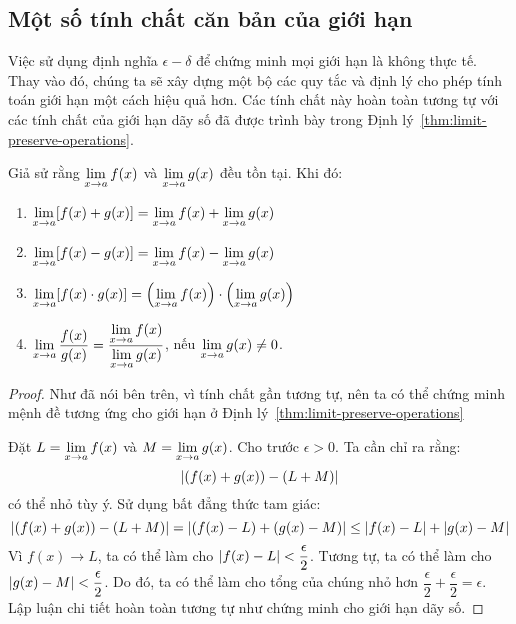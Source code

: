 
\subsection{Một số tính chất căn bản của giới hạn}
\label{subsec:tinh-chat-gioi-han}

Việc sử dụng định nghĩa $\epsilon-\delta$ để chứng minh mọi giới hạn là không thực tế. Thay vào đó, chúng ta sẽ xây dựng một bộ các quy tắc và định lý cho phép tính toán giới hạn một cách hiệu quả hơn. Các tính chất này hoàn toàn tương tự với các tính chất của giới hạn dãy số đã được trình bày trong Định lý~\ref{thm:limit-preserve-operations}.

\begin{theorem}
    \label{thm:limit-laws}
    Giả sử rằng $\lim\limits_{x \to a} f(x)$ và $\lim\limits_{x \to a} g(x)$ đều tồn tại. Khi đó:
    \begin{enumerate}[label=(\alph*)]
        \item $\lim\limits_{x \to a} [f(x) + g(x)] = \lim\limits_{x \to a} f(x) + \lim\limits_{x \to a} g(x)$
        \item $\lim\limits_{x \to a} [f(x) - g(x)] = \lim\limits_{x \to a} f(x) - \lim\limits_{x \to a} g(x)$
        \item $\lim\limits_{x \to a} [f(x) \cdot g(x)] = \left(\lim\limits_{x \to a} f(x)\right) \cdot \left(\lim\limits_{x \to a} g(x)\right)$
        \item $\lim\limits_{x \to a} \dfrac{f(x)}{g(x)} = \dfrac{\lim\limits_{x \to a} f(x)}{\lim\limits_{x \to a} g(x)}$, nếu $\lim\limits_{x \to a} g(x) \neq 0$.
    \end{enumerate}
\end{theorem}
\begin{proof} Như đã nói bên trên, vì tính chất gần tương tự, nên ta có thể chứng minh mệnh đề tương ứng cho giới hạn ở Định lý~\ref{thm:limit-preserve-operations}

    Đặt $L = \lim\limits_{x \to a} f(x)$ và $M = \lim\limits_{x \to a} g(x)$. Cho trước $\epsilon > 0$.
    Ta cần chỉ ra rằng:
    \[\left\lvert (f(x)+g(x)) - (L+M) \right\rvert\]
    có thể nhỏ tùy ý. Sử dụng bất đẳng thức tam giác:
    \begin{equation*}
        \left\lvert (f(x)+g(x)) - (L+M) \right\rvert = \left\lvert (f(x)-L) + (g(x)-M) \right\rvert \le \left\lvert f(x)-L \right\rvert + \left\lvert g(x)-M \right\rvert
    \end{equation*}
    Vì $f(x) \to L$, ta có thể làm cho $\left\lvert f(x)-L \right\rvert < \dfrac{\epsilon}{2}$. Tương tự, ta có thể làm cho $\left\lvert g(x)-M \right\rvert < \dfrac{\epsilon}{2}$.
    Do đó, ta có thể làm cho tổng của chúng nhỏ hơn $\dfrac{\epsilon}{2} + \dfrac{\epsilon}{2} = \epsilon$. Lập luận chi tiết hoàn toàn tương tự như chứng minh cho giới hạn dãy số.
\end{proof}


